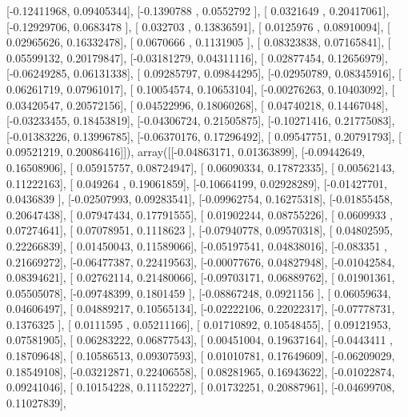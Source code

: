 \documentclass{article}
\begin{document}
       [-0.12411968,  0.09405344],
       [-0.1390788 ,  0.0552792 ],
       [ 0.0321649 ,  0.20417061],
       [-0.12929706,  0.0683478 ],
       [ 0.032703  ,  0.13836591],
       [ 0.0125976 ,  0.08910094],
       [ 0.02965626,  0.16332478],
       [ 0.0670666 ,  0.1131905 ],
       [ 0.08323838,  0.07165841],
       [ 0.05599132,  0.20179847],
       [-0.03181279,  0.04311116],
       [ 0.02877454,  0.12656979],
       [-0.06249285,  0.06131338],
       [ 0.09285797,  0.09844295],
       [-0.02950789,  0.08345916],
       [ 0.06261719,  0.07961017],
       [ 0.10054574,  0.10653104],
       [-0.00276263,  0.10403092],
       [ 0.03420547,  0.20572156],
       [ 0.04522996,  0.18060268],
       [ 0.04740218,  0.14467048],
       [-0.03233455,  0.18453819],
       [-0.04306724,  0.21505875],
       [-0.10271416,  0.21775083],
       [-0.01383226,  0.13996785],
       [-0.06370176,  0.17296492],
       [ 0.09547751,  0.20791793],
       [ 0.09521219,  0.20086416]]), array([[-0.04863171,  0.01363899],
       [-0.09442649,  0.16508906],
       [ 0.05915757,  0.08724947],
       [ 0.06090334,  0.17872335],
       [ 0.00562143,  0.11222163],
       [ 0.049264  ,  0.19061859],
       [-0.10664199,  0.02928289],
       [-0.01427701,  0.0436839 ],
       [-0.02507993,  0.09283541],
       [-0.09962754,  0.16275318],
       [-0.01855458,  0.20647438],
       [ 0.07947434,  0.17791555],
       [ 0.01902244,  0.08755226],
       [ 0.0609933 ,  0.07274641],
       [ 0.07078951,  0.1118623 ],
       [-0.07940778,  0.09570318],
       [ 0.04802595,  0.22266839],
       [ 0.01450043,  0.11589066],
       [-0.05197541,  0.04838016],
       [-0.083351  ,  0.21669272],
       [-0.06477387,  0.22419563],
       [-0.00077676,  0.04827948],
       [-0.01042584,  0.08394621],
       [ 0.02762114,  0.21480066],
       [-0.09703171,  0.06889762],
       [ 0.01901361,  0.05505078],
       [-0.09748399,  0.1801459 ],
       [-0.08867248,  0.0921156 ],
       [ 0.06059634,  0.04606497],
       [ 0.04889217,  0.10565134],
       [-0.02222106,  0.22022317],
       [-0.07778731,  0.1376325 ],
       [ 0.0111595 ,  0.05211166],
       [ 0.01710892,  0.10548455],
       [ 0.09121953,  0.07581905],
       [ 0.06283222,  0.06877543],
       [ 0.00451004,  0.19637164],
       [-0.0443411 ,  0.18709648],
       [ 0.10586513,  0.09307593],
       [ 0.01010781,  0.17649609],
       [-0.06209029,  0.18549108],
       [-0.03212871,  0.22406558],
       [ 0.08281965,  0.16943622],
       [-0.01022874,  0.09241046],
       [ 0.10154228,  0.11152227],
       [ 0.01732251,  0.20887961],
       [-0.04699708,  0.11027839],
\end{document}
